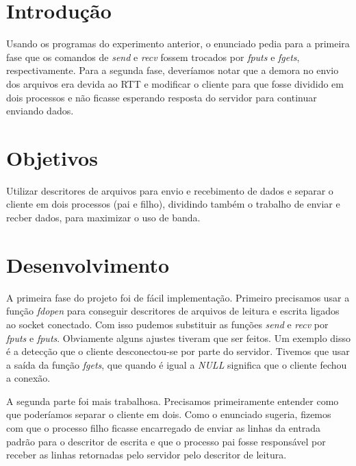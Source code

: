 \documentclass[12pt,a4paper]{article}
\begin{document}


\tableofcontents

\section{Introdução}

Usando os programas do experimento anterior, o enunciado pedia para a
primeira fase que os comandos de \textit{send} e \textit{recv} fossem
trocados por \textit{fputs} e \textit{fgets}, respectivamente. Para a
segunda fase, deveríamos notar que a demora no envio dos arquivos era
devida ao RTT e modificar o cliente para que fosse dividido em dois
processos e não ficasse esperando resposta do servidor para continuar
enviando dados.

\section{Objetivos}

Utilizar descritores de arquivos para envio e recebimento de dados e
separar o cliente em dois processos (pai e filho), dividindo também o
trabalho de enviar e recber dados, para maximizar o uso de banda.

\section{Desenvolvimento}

A primeira fase do projeto foi de fácil implementação. Primeiro
precisamos usar a função \textit{fdopen} para conseguir descritores de
arquivos de leitura e escrita ligados ao socket conectado. Com isso
pudemos substituir as funções \textit{send} e \textit{recv} por
\textit{fputs} e \textit{fputs}. Obviamente alguns ajustes tiveram que
ser feitos. Um exemplo disso é a detecção que o cliente desconectou-se
por parte do servidor. Tivemos que usar a saída da função
\textit{fgets}, que quando é igual a \textit{NULL} significa que o
cliente fechou a conexão.

A segunda parte foi mais trabalhosa. Precisamos primeiramente entender
como que poderíamos separar o cliente em dois. Como o enunciado
sugeria, fizemos com que o processo filho ficasse encarregado de
enviar as linhas da entrada padrão para o descritor de escrita e que o
processo pai fosse responsável por receber as linhas retornadas pelo
servidor pelo descritor de leitura.
\end{document}
